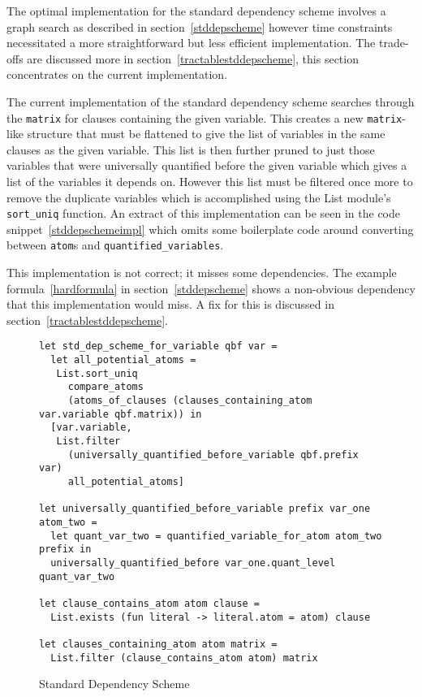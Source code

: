 The optimal implementation for the standard dependency scheme involves a graph search as described in section~\ref{stddepscheme} however time constraints necessitated a more straightforward but less efficient implementation. The trade-offs are discussed more in section~\ref{tractablestddepscheme}, this section concentrates on the current implementation.

The current implementation of the standard dependency scheme searches through the \texttt{matrix} for clauses containing the given variable. This creates a new \texttt{matrix}-like structure that must be flattened to give the list of variables in the same clauses as the given variable. This list is then further pruned to just those variables that were universally quantified before the given variable which gives a list of the variables it depends on. However this list must be filtered once more to remove the duplicate variables which is accomplished using the List module's \texttt{sort\_uniq} function. An extract of this implementation can be seen in the code snippet~\ref{stddepschemeimpl} which omits some boilerplate code around converting between \texttt{atom}s and \texttt{quantified\_variables}.

This implementation is not correct; it misses some dependencies. The example formula~\ref{hardformula} in section~\ref{stddepscheme} shows a non-obvious dependency that this implementation would miss. A fix for this is discussed in section~\ref{tractablestddepscheme}.

\begin{figure}[H]
\caption{Standard Dependency Scheme}
\begin{CenteredBox}
\begin{lstlisting}[language=caml, label=stddepschemeimpl]
let std_dep_scheme_for_variable qbf var =
  let all_potential_atoms =
   List.sort_uniq
     compare_atoms
     (atoms_of_clauses (clauses_containing_atom var.variable qbf.matrix)) in
  [var.variable,
   List.filter
     (universally_quantified_before_variable qbf.prefix var)
     all_potential_atoms]

let universally_quantified_before_variable prefix var_one atom_two =
  let quant_var_two = quantified_variable_for_atom atom_two prefix in
  universally_quantified_before var_one.quant_level quant_var_two

let clause_contains_atom atom clause =
  List.exists (fun literal -> literal.atom = atom) clause

let clauses_containing_atom atom matrix =
  List.filter (clause_contains_atom atom) matrix
\end{lstlisting}
\end{CenteredBox}
\end{figure}

